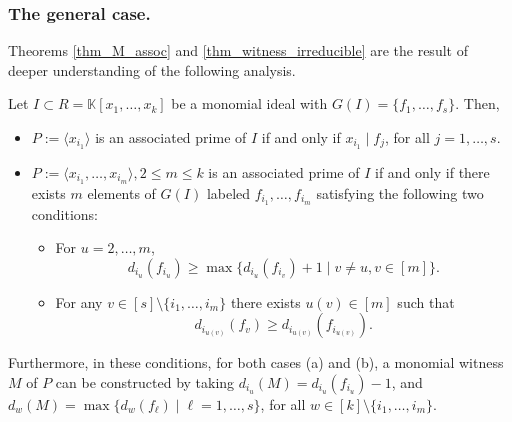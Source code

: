 \documentclass[11pt]{amsart}   %
\begin{document}
\medskip

\subsubsection{The general case.}\label{sec_general_witness} Theorems \ref{thm_M_assoc} and \ref{thm_witness_irreducible} are the result of deeper understanding of the following analysis.

\begin{thm} \label{thm_witness_any_monomial}Let $I\subset R=\mathbb K[x_1,\ldots,x_k]$ be a monomial ideal with $G(I)=\{f_1,\ldots,f_s\}$. Then, 
\begin{itemize}
\item[(a)] $P:=\langle x_{i_1}\rangle$ is an associated prime of $I$ if and only if $x_{i_1}\mid f_j$, for all $j=1,\ldots,s$.

\item[(b)] $P:=\langle x_{i_1},\ldots,x_{i_m}\rangle, 2\leq m\leq k$ is an associated prime of $I$ if and only if there exists $m$ elements of $G(I)$ labeled $f_{i_1},\ldots,f_{i_m}$ satisfying the following two conditions:
\begin{itemize}
    \item[(i)] For $u=2,\ldots,m$, $$d_{i_u}(f_{i_u})\geq \max\{d_{i_u}(f_{i_v})+1\mid v\neq u, v\in[m]\}.$$
    \item[(ii)] For any $v\in[s]\setminus\{i_1,\ldots,i_m\}$ there exists $u(v)\in[m]$ such that $$d_{i_{u(v)}}(f_v)\geq d_{i_{u(v)}}(f_{i_{u(v)}}).$$    
\end{itemize}
\end{itemize}
Furthermore, in these conditions, for both cases (a) and (b), a monomial witness $M$ of $P$ can be constructed by taking $d_{i_u}(M)=d_{i_u}(f_{i_u})-1$, and $d_w(M)=\max\{d_w(f_{\ell})\mid\ell=1,\ldots,s\}$, for all $w\in[k]\setminus\{i_1,\ldots,i_m\}$.
\end{thm}
\end{document}

